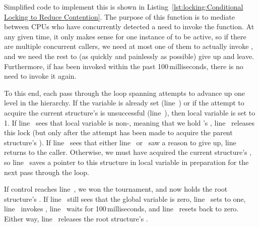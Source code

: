 Simplified code to implement this is shown in
Listing~\ref{lst:locking:Conditional Locking to Reduce Contention}.
The purpose of this function is to mediate between CPUs who have concurrently
detected a need to invoke the  function.
At any given time, it only makes sense for one instance of
 to be active, so if there are multiple
concurrent callers, we need at most one of them to actually invoke
, and we need the rest to (as quickly and
painlessly as possible) give up and leave.
Furthermore, if  has been invoked within
the past 100\,milliseconds, there is no need to invoke it again.

\begin{fcvref}
To this end, each pass through the loop spanning  attempts
to advance up one level in the  hierarchy.
If the  variable is already set (line~) or if the attempt
to acquire the current  structure's  is
unsuccessful (line~), then local variable  is set to 1.
If line~ sees that local variable  is non-,
meaning that we hold 's ,
line~ releases this lock (but only after the attempt has been made
to acquire the parent  structure's ).
If line~ sees that either line~ or~
saw a reason to give up,
line~ returns to the caller.
Otherwise, we must have acquired the current  structure's
, so line~ saves a pointer to this structure in local
variable  in preparation for the next pass through the loop.

If control reaches line~, we won the tournament, and now holds the
root  structure's .
If line~ still sees that the global variable  is zero,
line~ sets  to one, line~ invokes
, line~ waits for 100\,milliseconds,
and line~ resets  back to zero.
Either way, line~ releases the root  structure's
.
\end{fcvref}

